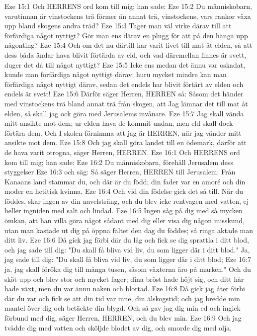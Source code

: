 Eze 15:1  Och HERRENS ord kom till mig; han sade:
Eze 15:2  Du människobarn, varutinnan är vinstockens trä förmer än annat trä, vinstockens, vars rankor växa upp bland skogens andra träd?
Eze 15:3  Tager man väl virke därav till att förfärdiga något nyttigt? Gör man ens därav en plugg för att på den hänga upp någonting?
Eze 15:4  Och om det nu därtill har varit livet till mat åt elden, så att dess båda ändar hava blivit förtärda av eld, och vad däremellan finnes är svett, duger det då till något nyttigt?
Eze 15:5  Icke ens medan det ännu var oskadat, kunde man förfärdiga något nyttigt därav; huru mycket mindre kan man förfärdiga något nyttigt därav, sedan det endels har blivit förtärt av elden och endels är svett!
Eze 15:6  Därför säger Herren, HERREN så: Såsom det händer med vinstockens trä bland annat trä från skogen, att Jag lämnar det till mat åt elden, så skall jag ock göra med Jerusalems invånare.
Eze 15:7  Jag skall vända mitt ansikte mot dem; ur elden hava de kommit undan, men eld skall dock förtära dem. Och I skolen förnimma att jag är HERREN, när jag vänder mitt ansikte mot dem.
Eze 15:8  Och jag skall göra landet till en ödemark, därför att de hava varit otrogna, säger Herren, HERREN.
Eze 16:1  Och HERRENS ord kom till mig; han sade:
Eze 16:2  Du människobarn, förehåll Jerusalem dess styggelser
Eze 16:3  och säg: Så säger Herren, HERREN till Jerusalem: Från Kanaans land stammar du, och där är du född; din fader var en amoré och din moder en hetitisk kvinna.
Eze 16:4  Och vid din födelse gick det så till. När du föddes, skar ingen av din navelsträng, och du blev icke rentvagen med vatten, ej heller ingniden med salt och lindad.
Eze 16:5  Ingen såg på dig med så mycken ömkan, att han villa göra något sådant med dig eller visa dig någon misskund, utan man kastade ut dig på öppna fältet den dag du föddes; så ringa aktade man ditt liv.
Eze 16:6  Då gick jag förbi där du låg och fick se dig sprattla i ditt blod, och jag sade till dig: "Du skall få bliva vid liv, du som ligger där i ditt blod." Ja, jag sade till dig: "Du skall få bliva vid liv, du som ligger där i ditt blod;
Eze 16:7  ja, jag skall föröka dig till många tusen, såsom växterna äro på marken." Och du sköt upp och blev stor och mycket fager; dina bröst hade höjt sig, och ditt hår hade växt, men du var ännu naken och blottad.
Eze 16:8  Då gick jag åter förbi där du var och fick se att din tid var inne, din älskogstid; och jag bredde min mantel över dig och betäckte din blygd. Och så gav jag dig min ed och ingick förbund med dig, säger Herren, HERREN, och du blev min.
Eze 16:9  Och jag tvådde dig med vatten och sköljde blodet av dig, och smorde dig med olja,
